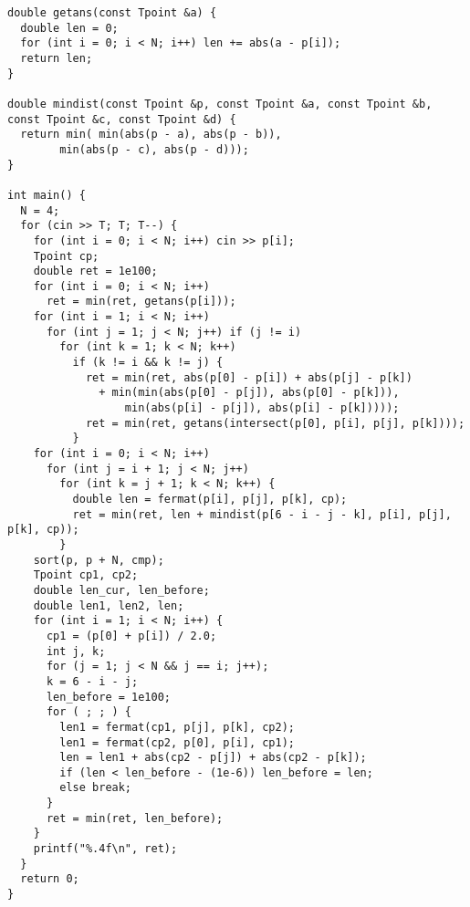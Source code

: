 \begin{lstlisting}
double getans(const Tpoint &a) {
  double len = 0;
  for (int i = 0; i < N; i++) len += abs(a - p[i]);
  return len;
}

double mindist(const Tpoint &p, const Tpoint &a, const Tpoint &b, const Tpoint &c, const Tpoint &d) {
  return min( min(abs(p - a), abs(p - b)),
        min(abs(p - c), abs(p - d)));
}

int main() {
  N = 4;
  for (cin >> T; T; T--) {
    for (int i = 0; i < N; i++) cin >> p[i];
    Tpoint cp;
    double ret = 1e100;
    for (int i = 0; i < N; i++)
      ret = min(ret, getans(p[i]));
    for (int i = 1; i < N; i++)
      for (int j = 1; j < N; j++) if (j != i)
        for (int k = 1; k < N; k++)
          if (k != i && k != j) {
            ret = min(ret, abs(p[0] - p[i]) + abs(p[j] - p[k])
              + min(min(abs(p[0] - p[j]), abs(p[0] - p[k])),
                  min(abs(p[i] - p[j]), abs(p[i] - p[k]))));
            ret = min(ret, getans(intersect(p[0], p[i], p[j], p[k])));
          }
    for (int i = 0; i < N; i++)
      for (int j = i + 1; j < N; j++)
        for (int k = j + 1; k < N; k++) {
          double len = fermat(p[i], p[j], p[k], cp);
          ret = min(ret, len + mindist(p[6 - i - j - k], p[i], p[j], p[k], cp));
        }
    sort(p, p + N, cmp);
    Tpoint cp1, cp2;
    double len_cur, len_before;
    double len1, len2, len;
    for (int i = 1; i < N; i++) {
      cp1 = (p[0] + p[i]) / 2.0;
      int j, k;
      for (j = 1; j < N && j == i; j++);
      k = 6 - i - j;
      len_before = 1e100;
      for ( ; ; ) {
        len1 = fermat(cp1, p[j], p[k], cp2);
        len1 = fermat(cp2, p[0], p[i], cp1);
        len = len1 + abs(cp2 - p[j]) + abs(cp2 - p[k]);
        if (len < len_before - (1e-6)) len_before = len;
        else break;
      }
      ret = min(ret, len_before);
    }
    printf("%.4f\n", ret);
  }
  return 0;
}


\end{lstlisting}